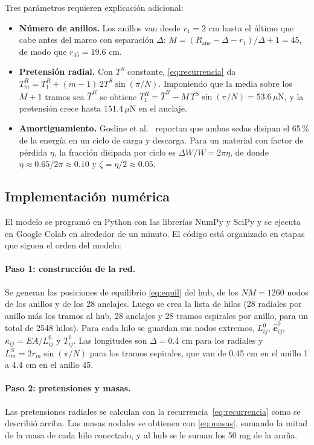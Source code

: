 \documentclass[11pt,letterpaper]{article}
\newcommand{\uN}{\,\mu\mathrm{N}}
\begin{document}
Tres parámetros requieren explicación adicional:
\begin{itemize}
    \item \textbf{Número de anillos.} Los anillos van desde $r_1=2$ cm hasta
    el último que cabe antes del marco con separación $\Delta$:
    $M=(R_{\text{anc}}-\Delta-r_1)/\Delta+1=45$, de modo que $r_{45}=19.6$
    cm.
    \item \textbf{Pretensión radial.} Con $T^S$ constante,
    \eqref{eq:recurrencia} da $T^R_m=T^R_1+(m-1)\,2T^S\sin(\pi/N)$. Imponiendo
    que la media sobre los $M+1$ tramos sea $\bar{T}^R$ se obtiene
    $T^R_1=\bar{T}^R-M\,T^S\sin(\pi/N)=53.6\uN$, y la pretensión crece hasta
    $151.4\uN$ en el anclaje.
    \item \textbf{Amortiguamiento.} Gosline et al.\ \cite{gosline1999}
    reportan que ambas sedas disipan el 65\,\% de la energía en un ciclo de
    carga y descarga. Para un material con factor de pérdida $\eta$, la
    fracción disipada por ciclo es $\Delta W/W=2\pi\eta$, de donde
    $\eta\approx0.65/2\pi\approx0.10$ y $\zeta=\eta/2\approx0.05$.
\end{itemize}

\subsection{Implementación numérica}

El modelo se programó en Python con las librerías NumPy y SciPy y se ejecuta
en Google Colab en alrededor de un minuto. El código está organizado en
etapas que siguen el orden del modelo:

\paragraph{Paso 1: construcción de la red.} Se generan las posiciones de
equilibrio \eqref{eq:equil} del hub, de los $NM=1260$ nodos de los anillos
y de los 28 anclajes. Luego se crea la lista de hilos (28 radiales por
anillo más los tramos al hub, 28 anclajes y 28 tramos espirales por anillo,
para un total de 2548 hilos). Para cada hilo se guardan sus nodos extremos,
$L^0_{ij}$, $\hat{\mathbf{e}}^0_{ij}$, $\kappa_{ij}=EA/L^0_{ij}$ y
$T^0_{ij}$. Las longitudes son $\Delta=0.4$ cm para los radiales y
$L^S_m=2r_m\sin(\pi/N)$ para los tramos espirales, que van de 0.45 cm en el
anillo 1 a 4.4 cm en el anillo 45.

\paragraph{Paso 2: pretensiones y masas.} Las pretensiones radiales se
calculan con la recurrencia~\eqref{eq:recurrencia} como se describió arriba.
Las masas nodales se obtienen con \eqref{eq:masas}, sumando la mitad de la
masa de cada hilo conectado, y al hub se le suman los 50 mg de la araña.
\end{document}
